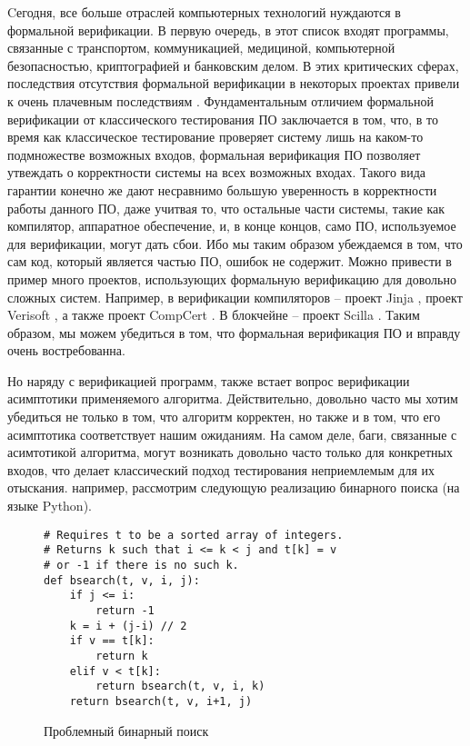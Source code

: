Cегодня, все больше отраслей компьютерных технологий нуждаются в формальной верификации. В первую очередь, в этот список входят программы,
связанные с транспортом, коммуникацией, медициной, компьютерной безопасностью, криптографией и банковским делом. 
В этих критических сферах,
последствия отсутствия формальной верификации в некоторых проектах привели к очень плачевным последствиям \cite{horror}.
Фундаментальным отличием формальной верификации от классического тестирования ПО заключается в том, что, в то время как классическое
тестирование проверяет систему лишь на каком-то подмножестве возможных входов, формальная верификация ПО позволяет утвеждать о
корректности системы на всех возможных входах. Такого вида гарантии конечно же дают несравнимо большую уверенность в корректности
работы данного ПО, даже учитвая то, что остальные части системы, такие как компилятор, аппаратное обеспечение, и,
в конце концов, само ПО, используемое для верификации, могут дать сбои. Ибо мы таким образом убеждаемся в том, что сам код, который
является частью ПО, ошибок не содержит. Можно привести в пример много проектов, использующих формальную верификацию для довольно сложных
систем. Например, в верификации компиляторов -- проект Jinja \cite{KleinN-TCS,KleinN-ACM}, проект Verisoft
\cite{Strecker_compilerverification,Leinenbach}, а также проект CompCert \cite{Xavier,CompCert}.
В блокчейне -- проект Scilla \cite{sergey2018scilla}. Таким образом, мы можем убедиться в том, что формальная верификация ПО
и вправду очень востребованна. 
\par
Но наряду с верификацией программ, также встает вопрос верификации асимптотики применяемого алгоритма. Действительно, довольно часто
мы хотим убедиться не только в том, что алгоритм корректен, но также и в том, что его асимптотика соответствует нашим ожиданиям.
На самом деле, баги, связанные с асимтотикой алгоритма, могут возникать довольно часто только для конкретных входов, что делает
классический подход тестирования неприемлемым для их отыскания. например, рассмотрим следующую реализацию бинарного поиска
(на языке Python).
\pagebreak
\begin{figure}[H]
  \caption{Проблемный бинарный поиск}
  \label{code:bsearch}
  \begin{verbatim}
# Requires t to be a sorted array of integers.
# Returns k such that i <= k < j and t[k] = v
# or -1 if there is no such k.
def bsearch(t, v, i, j):
    if j <= i:
        return -1
    k = i + (j-i) // 2
    if v == t[k]:
        return k
    elif v < t[k]:
        return bsearch(t, v, i, k)
    return bsearch(t, v, i+1, j)
\end{verbatim}
\end{figure}
